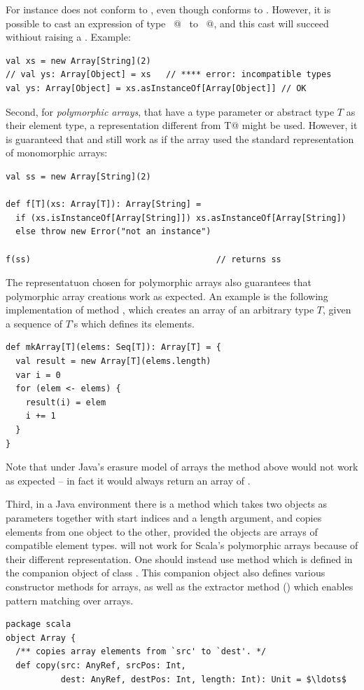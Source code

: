 {For instance  does not conform to
, even though  conforms to .
However, it is possible to cast an expression of type
~\lstinline@Array[String]@~ to ~\lstinline@Array[Object]@, and this
cast will succeed withiout raising a . Example:
\begin{lstlisting}
val xs = new Array[String](2)
// val ys: Array[Object] = xs   // **** error: incompatible types
val ys: Array[Object] = xs.asInstanceOf[Array[Object]] // OK
\end{lstlisting}

Second, for {\em polymorphic arrays}, that have a type parameter or
abstract type $T$ as their element type, a representation different
from
\lstinline@[]T@ might be used. However, it is guaranteed that 
 and  still work as if the array 
used the standard representation of monomorphic arrays:
\begin{lstlisting}
val ss = new Array[String](2)

def f[T](xs: Array[T]): Array[String] = 
  if (xs.isInstanceOf[Array[String]]) xs.asInstanceOf[Array[String])
  else throw new Error("not an instance")

f(ss)                                     // returns ss
\end{lstlisting}
The representatuon chosen for polymorphic arrays also guarantees that
polymorphic array creations work as expected. An example is the
following implementation of method \lstinline@mkArray@, which creates
an array of an arbitrary type $T$, given a sequence of $T$'s which
defines its elements.
\begin{lstlisting}
def mkArray[T](elems: Seq[T]): Array[T] = {
  val result = new Array[T](elems.length)
  var i = 0
  for (elem <- elems) {
    result(i) = elem
    i += 1
  }
}
\end{lstlisting}
Note that under Java's erasure model of arrays the method above would
not work as expected -- in fact it would always return an array of
\lstinline@Object@.

Third, in a Java environment there is a method 
which takes two objects as parameters together with start indices and
a length argument, and copies elements from one object to the other,
provided the objects are arrays of compatible element
types.  will not work for Scala's polymorphic
arrays because of their different representation. One should instead
use method  which is defined in the companion object
of class \lstinline@Array@. This companion object also defines various
constructor methods for arrays, as well as 
the extractor method  ()
which enables pattern matching over arrays.
\begin{lstlisting}
package scala
object Array { 
  /** copies array elements from `src' to `dest'. */
  def copy(src: AnyRef, srcPos: Int, 
           dest: AnyRef, destPos: Int, length: Int): Unit = $\ldots$


\end{lstlisting}}
